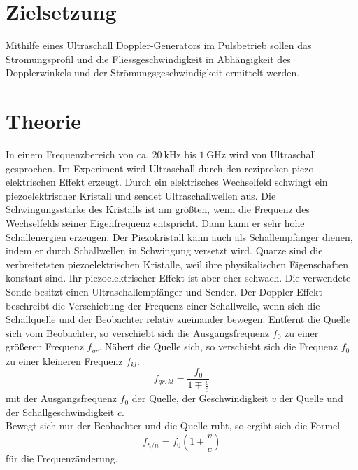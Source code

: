 \section{Zielsetzung}
\label{sec:Zielsetzung}

Mithilfe eines Ultraschall Doppler-Generators im Pulsbetrieb sollen das Stromungsprofil und die Fliessgeschwindigkeit
in Abhängigkeit des Dopplerwinkels und der Strömungsgeschwindigkeit ermittelt werden.

\section{Theorie}
\label{sec:Theorie}

In einem Frequenzbereich von ca. $\SI{20}{\kilo\Hz}$ bis $\SI{1}{\giga\Hz}$ wird von Ultraschall gesprochen.
Im Experiment wird Ultraschall durch den reziproken piezo-elektrischen Effekt erzeugt. 
Durch ein elektrisches Wechselfeld schwingt ein piezoelektrischer Kristall und sendet Ultraschallwellen aus.
Die Schwingungsstärke des Kristalls ist am größten, wenn die Frequenz des Wechselfelds seiner Eigenfrequenz entspricht. 
Dann kann er sehr hohe Schallenergien erzeugen. Der Piezokristall kann auch als Schallempfänger dienen, 
indem er durch Schallwellen in Schwingung versetzt wird. Quarze sind die verbreitetsten piezoelektrischen Kristalle, 
weil ihre physikalischen Eigenschaften konstant sind. Ihr piezoelektrischer Effekt ist aber eher schwach.
Die verwendete Sonde besitzt einen Ultraschallempfänger und Sender.
Der Doppler-Effekt beschreibt die Verschiebung der Frequenz einer Schallwelle, wenn sich die Schallquelle und 
der Beobachter relativ zueinander bewegen. 
Entfernt die Quelle sich vom Beobachter, so verschiebt sich die Ausgangsfrequenz $f_0$ zu einer größeren Frequenz $f_{gr}.$
Nähert die Quelle sich, so verschiebt sich die Frequenz $f_0$ zu einer kleineren Frequenz $f_{kl}.$
\begin{equation}\label{eq:Doppler1}
    f_{gr,kl} = \frac{f_0}{1 \mp \frac{v}{c}}%
\end{equation}
mit der Ausgangsfrequenz $f_0$ der Quelle, der Geschwindigkeit $v$ der Quelle und der Schallgeschwindigkeit $c$.\\
Bewegt sich nur der Beobachter und die Quelle ruht, so ergibt sich die Formel
\begin{equation}\label{eq:Doppler2}
    f_{h/n} = f_0 \left(1 \pm \frac{v}{c}\right)
\end{equation}
für die Frequenzänderung.\\

